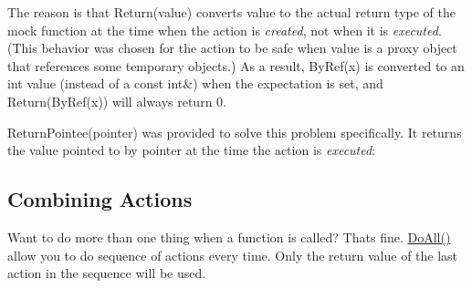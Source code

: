 \begin{DoxyCode}{0}
\end{DoxyCode}


The reason is that {\ttfamily Return(value)} converts {\ttfamily value} to the actual return type of the mock function at the time when the action is {\itshape created}, not when it is {\itshape executed}. (This behavior was chosen for the action to be safe when {\ttfamily value} is a proxy object that references some temporary objects.) As a result, {\ttfamily By\+Ref(x)} is converted to an {\ttfamily int} value (instead of a {\ttfamily const int\&}) when the expectation is set, and {\ttfamily Return(\+By\+Ref(x))} will always return 0.

{\ttfamily Return\+Pointee(pointer)} was provided to solve this problem specifically. It returns the value pointed to by {\ttfamily pointer} at the time the action is {\itshape executed}\+:


\begin{DoxyCode}{0}
\end{DoxyCode}


\subsection*{Combining Actions}

Want to do more than one thing when a function is called? That\textquotesingle{}s fine. {\ttfamily \mbox{\hyperlink{namespacetesting_a5f533932753d2af95000e96c4a3042e3}{Do\+All()}}} allow you to do sequence of actions every time. Only the return value of the last action in the sequence will be used.


\begin{DoxyCode}{0}
\DoxyCodeLine{}
\DoxyCodeLine{\};}
\DoxyCodeLine{}
\end{DoxyCode}


